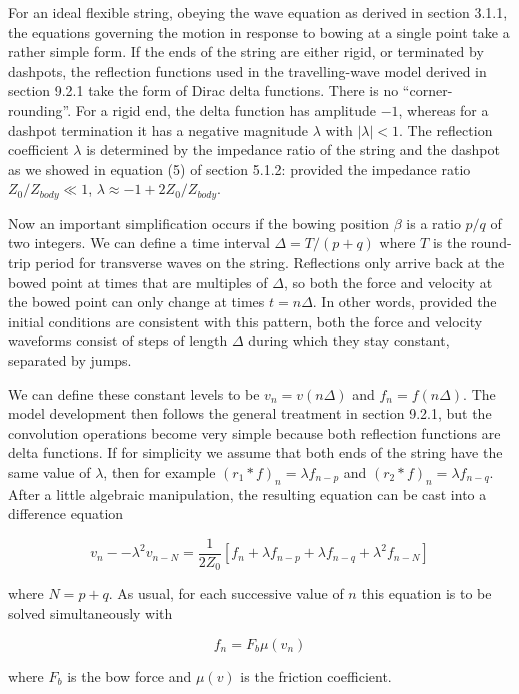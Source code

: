   For an ideal flexible string, obeying the wave equation as derived in section 
  3.1.1, the equations governing the motion in response to bowing at a single 
  point take a rather simple form. If the ends of the string are either rigid, 
  or terminated by dashpots, the reflection functions used in the 
  travelling-wave model derived in section 9.2.1 take the form of Dirac delta 
  functions. There is no ``corner-rounding''. For a rigid end, the delta 
  function has amplitude $-1$, whereas for a dashpot termination it has a 
  negative magnitude $\lambda$ with $|\lambda| < 1$. The reflection coefficient 
  $\lambda$ is determined by the impedance ratio of the string and the dashpot 
  as we showed in equation (5) of section 5.1.2: provided the impedance ratio 
  $Z_{0}/Z_{body} \ll 1$, $\lambda \approx -1 + 2Z_{0}/Z_{body}$. 

  Now an important simplification occurs if the bowing position $\beta$ is a 
  ratio $p/q$ of two integers. We can define a time interval $\Delta=T/(p+q)$ 
  where $T$ is the round-trip period for transverse waves on the string. 
  Reflections only arrive back at the bowed point at times that are multiples 
  of $\Delta$, so both the force and velocity at the bowed point can only 
  change at times $t=n\Delta$. In other words, provided the initial conditions 
  are consistent with this pattern, both the force and velocity waveforms 
  consist of steps of length $\Delta$ during which they stay constant, 
  separated by jumps. 

  We can define these constant levels to be $v_n=v(n \Delta)$ and $f_n=f(n 
  \Delta)$. The model development then follows the general treatment in section 
  9.2.1, but the convolution operations become very simple because both 
  reflection functions are delta functions. If for simplicity we assume that 
  both ends of the string have the same value of $\lambda$, then for example 
  $(r_1 * f)_n = \lambda f_{n-p}$ and $(r_2 * f)_n = \lambda f_{n-q}$. After a 
  little algebraic manipulation, the resulting equation can be cast into a 
  difference equation 

  $$v_n -- \lambda^2 v_{n-N} = \dfrac{1}{2Z_0} \left[f_n + \lambda f_{n-p} + 
  \lambda f_{n-q} + \lambda^2 f_{n-N} \right] \tag{1}$$ 

  where $N=p+q$. As usual, for each successive value of $n$ this equation is to 
  be solved simultaneously with 

  $$f_n = F_b \mu(v_n) \tag{2}$$ 

  where $F_b$ is the bow force and $\mu(v)$ is the friction coefficient. 

